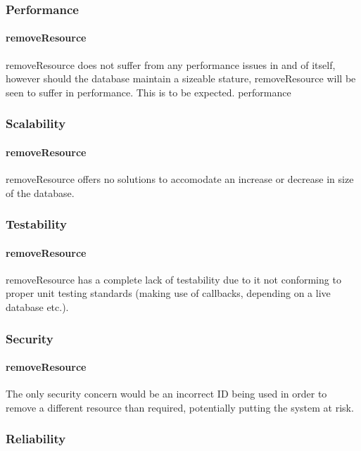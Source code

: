 \documentclass[a4paper]{article}
\begin{document}
\subsubsection {Performance}

\paragraph{removeResource}
removeResource does not suffer from any performance issues in and of itself, however should the database maintain a sizeable stature, removeResource will be seen to suffer in performance. This is to be expected.
performance


\subsubsection {Scalability}

\paragraph{removeResource}
removeResource offers no solutions to accomodate an increase or decrease in size of the database.

\subsubsection {Testability}

\paragraph{removeResource}
removeResource has a complete lack of testability due to it not conforming to proper unit testing standards (making use of callbacks, depending on a live database etc.).

\subsubsection {Security}

\paragraph{removeResource}
The only security concern would be an incorrect ID being used in order to remove a different resource than required, potentially putting the system at risk.

\subsubsection {Reliability}
\end{document}
